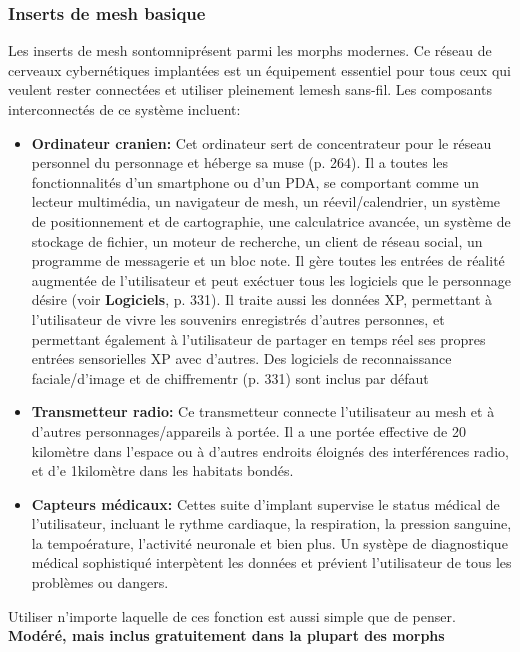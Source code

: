 \subsubsection{Inserts de mesh basique} 

Les inserts de mesh sontomniprésent parmi les morphs modernes. Ce réseau de cerveaux cybernétiques implantées est un équipement essentiel pour tous ceux qui veulent rester connectées et utiliser pleinement lemesh sans-fil. Les composants interconnectés de ce système incluent: 

\begin{itemize} \item \textbf{Ordinateur cranien:} Cet ordinateur sert de concentrateur pour le réseau personnel du personnage et héberge sa muse (p. 264). Il a toutes les fonctionnalités d'un smartphone ou d'un PDA, se comportant comme un lecteur multimédia, un navigateur de mesh, un réevil/calendrier, un système de positionnement et de cartographie, une calculatrice avancée, un système de stockage de fichier, un moteur de recherche, un client de réseau social, un programme de messagerie et un bloc note. Il gère toutes les entrées de réalité augmentée de l'utilisateur et peut exéctuer tous les logiciels que le personnage désire (voir \textbf{Logiciels}, p. 331). Il traite aussi les données XP, permettant à l'utilisateur de vivre les souvenirs enregistrés d'autres personnes, et permettant également à l'utilisateur de partager en temps réel ses propres entrées sensorielles XP avec d'autres. Des logiciels de reconnaissance faciale/d'image et de chiffrementr (p. 331) sont inclus par défaut \item \textbf{Transmetteur radio:} Ce transmetteur connecte l'utilisateur au mesh et à d'autres personnages/appareils à portée. Il a une portée effective de 20 kilomètre dans l'espace ou à d'autres endroits éloignés des interférences radio, et d'e 1kilomètre dans les habitats bondés. \item \textbf{Capteurs médicaux:} Cettes suite d'implant supervise le status médical de l'utilisateur, incluant le rythme cardiaque, la respiration, la pression sanguine, la tempoérature, l'activité neuronale et bien plus. Un systèpe de diagnostique médical sophistiqué interpètent les données et prévient l'utilisateur de tous les problèmes ou dangers. \end{itemize} 

Utiliser n'importe laquelle de ces fonction est aussi simple que de penser. \textbf{{Modéré, mais inclus gratuitement dans la plupart des morphs}} 

